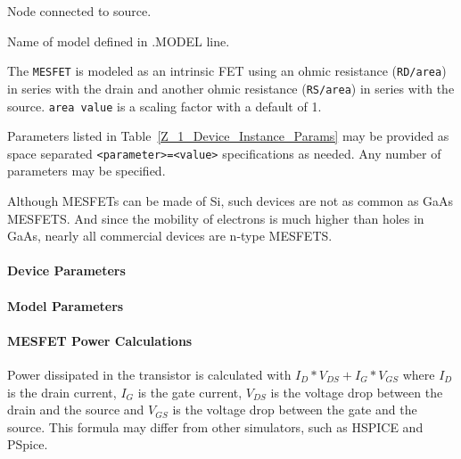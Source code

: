 \begin{Device}
\begin{Parameters}
Node connected to source.

Name of model defined in .MODEL line.


The \texttt{MESFET} is modeled as an intrinsic FET using an ohmic
resistance (\texttt{RD/area}) in series with the drain and another ohmic
resistance (\texttt{RS/area}) in series with the source.  \texttt{area value}
is a scaling factor with a default of 1.


Parameters listed in Table~\ref{Z_1_Device_Instance_Params} may be
provided as space separated \texttt{<parameter>=<value>} specifications
as needed.  Any number of parameters may be specified.

\end{Parameters}

\comments

Although MESFETs can be made of Si, such devices are not as common as
GaAs MESFETS.  And since the mobility of electrons is much higher than
holes in GaAs, nearly all commercial devices are n-type MESFETS.

\end{Device}

\pagebreak

\paragraph{Device Parameters}


\paragraph{Model Parameters}


\paragraph{MESFET Power Calculations}
Power dissipated in the transistor is calculated with $I_{D}*V_{DS}+I_{G}*V_{GS}$ where
$I_{D}$ is the drain current, $I_{G}$ is the gate current, $V_{DS}$ is the 
voltage drop between the drain and the source and $V_{GS}$ is the voltage drop 
between the gate and the source. This formula may differ from other simulators,
such as HSPICE and PSpice.
